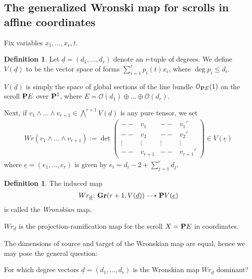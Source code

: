 \documentclass[11pt,reqno]{amsart}
\theoremstyle{plain}
\theoremstyle{definition}
\newtheorem{definition}[theorem]{Definition}
\theoremstyle{remark}
\numberwithin{equation}{section}
\numberwithin{equation}{section}
\renewcommand{\O}{\mathcal O}
\begin{document}
\subsection{The generalized Wronski map for scrolls in affine coordinates} %
 \label{sub:the_generalized_wronski_map}
 
 Fix variables $x_{1}, \dots, x_{r}, t$.
\begin{definition}
  \label{definition:V}
  Let $\underline{d} = (d_{1}, \dots, d_{r})$ denote an $r$-tuple of degrees. We define $V(\underline{d})$ to be the vector space of forms $\sum_{i=1}^{r}p_{i}(t)x_{i}$, where $\deg p_{i} \leq d_{i}$.
\end{definition}

\begin{remark}
  $V(\underline{d})$ is simply the space of global sections of the line bundle $\O_{\P E}(1)$ on the scroll $\P E$ over $\P^{1}$, where $E = \O(d_{1}) \oplus \dots \oplus \O(d_{r})$.
\end{remark}

Next, if $v_{1} \wedge \dots \wedge v_{r+1} \in \bigwedge^{r+1}V(\underline{d})$ is any pure tensor, we set 
\begin{align}
  Wr(v_{1} \wedge \dots \wedge v_{r+1}) := \det \begin{pmatrix}
    -- & v_{1} & -- & v_{1}'\\
    -- & v_{2} & -- & v_{2}'\\
    \vdots& \vdots & \vdots & \vdots\\
    -- & v_{r+1} & -- & v_{r+1}'
  \end{pmatrix} \in V(\underline{e})
\end{align}
where $\underline{e}= (e_{1}, \dots, e_{r})$ is given by $e_{i} = d_{i}-2 + \sum_{j=1}^{r}d_{j}$.

\begin{definition}
  \label{definition:Wronskian}
  The induced map 
  \begin{align}
    Wr_{\underline{d}}\from \Gr(r+1, V(\underline{d})) \dashrightarrow \P V(\underline{e})
  \end{align}
  is called the {\sl Wronskian} map.
\end{definition}

\begin{remark}
  $Wr_{\underline{d}}$ is the projection-ramification map for the scroll $X = \P E$ in coordinates.
\end{remark}

The dimensions of source and target of the Wronskian map are equal, hence we may pose the general question: 
\begin{problem}
\label{problem:DominantWronskian}
  For which degree vectors $\underline{d} = (d_{1}, ..., d_{r})$ is the Wronskian map $Wr_{\underline{d}}$ dominant?
\end{problem}
\end{document}
